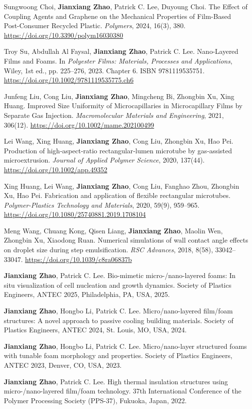 \begin{pubcounter}
\item Sungwoong Choi, \textbf{Jianxiang Zhao}, Patrick C. Lee, Duyoung Choi. The Effect of Coupling Agents and Graphene on the Mechanical Properties of Film-Based Post-Consumer Recycled Plastic. \textit{Polymers}, 2024, 16(3), 380. \url{https://doi.org/10.3390/polym16030380}
\item Troy Su, Abdullah Al Faysal, \textbf{Jianxiang Zhao}, Patrick C. Lee. Nano-Layered Films and Foams. In \textit{Polyester Films: Materials, Processes and Applications}, Wiley, 1st ed., pp. 225--276, 2023. Chapter 6. ISBN 9781119535751. \url{https://doi.org/10.1002/9781119535775.ch6}
\item Junfeng Liu, Cong Liu, \textbf{Jianxiang Zhao}, Mingcheng Bi, Zhongbin Xu, Xing Huang. Improved Size Uniformity of Microcapillaries in Microcapillary Films by Separate Gas Injection. \textit{Macromolecular Materials and Engineering}, 2021, 306(12). \url{https://doi.org/10.1002/mame.202100499}
\item Lei Wang, Xing Huang, \textbf{Jianxiang Zhao}, Cong Liu, Zhongbin Xu, Hao Pei. Production of high‐aspect‐ratio rectangular‐lumen microtube by gas‐assisted microextrusion. \textit{Journal of Applied Polymer Science}, 2020, 137(44). \url{https://doi.org/10.1002/app.49352}
\item Xing Huang, Lei Wang, \textbf{Jianxiang Zhao}, Cong Liu, Fanghao Zhou, Zhongbin Xu, Hao Pei. Fabrication and application of flexible rectangular microtubes. \textit{Polymer-Plastics Technology and Materials}, 2020, 59(9), 959--965. \url{https://doi.org/10.1080/25740881.2019.1708104}
\item Meng Wang, Chuang Kong, Qisen Liang, \textbf{Jianxiang Zhao}, Maolin Wen, Zhongbin Xu, Xiaodong Ruan. Numerical simulations of wall contact angle effects on droplet size during step emulsification. \textit{RSC Advances}, 2018, 8(58), 33042--33047. \url{https://doi.org/10.1039/c8ra06837b}
\end{pubcounter}

\begin{pubcounter}
\item \textbf{Jianxiang Zhao}, Patrick C. Lee. Bio-mimetic micro-/nano-layered foams: In situ visualization of cell nucleation and growth dynamics. Society of Plastics Engineers, ANTEC 2025, Philadelphia, PA, USA, 2025.
\item \textbf{Jianxiang Zhao}, Hongbo Li, Patrick C. Lee. Micro/nano-layered film/foam structures: A novel approach to passive cooling building materials. Society of Plastics Engineers, ANTEC 2024, St. Louis, MO, USA, 2024.
\item \textbf{Jianxiang Zhao}, Hongbo Li, Patrick C. Lee. Micro/nano-layer structured foams with tunable foam morphology and properties. Society of Plastics Engineers, ANTEC 2023, Denver, CO, USA, 2023.
\item \textbf{Jianxiang Zhao}, Patrick C. Lee. High thermal insulation structures using micro-/nano-layered film/foam technology. 37th International Conference of the Polymer Processing Society (PPS-37), Fukuoka, Japan, 2022.
\end{pubcounter}

